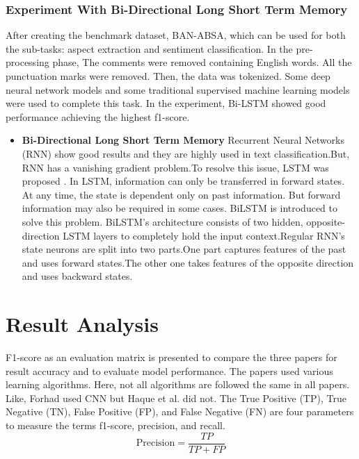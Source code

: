 \documentclass[a4paper,12pt]{article}
\begin{document}
\subsubsection{Experiment With Bi-Directional Long Short Term Memory}
After creating the benchmark dataset, BAN-ABSA, which can be used for both the sub-tasks: aspect extraction and sentiment classification.\newline
In the pre-processing phase, The comments were removed containing English words. All the punctuation marks were removed. Then, the data was tokenized.\newline
Some deep neural network models and some traditional supervised machine learning models were used to complete this task. In the experiment, Bi-LSTM showed good performance achieving the highest f1-score.
\begin{itemize}
    \item \textbf{Bi-Directional Long Short Term Memory}\newline
    Recurrent Neural Networks (RNN) show good results and they are highly used in text classification.But, RNN has a vanishing gradient problem.To resolve this issue, LSTM was proposed \cite{lstm}.\newline
    In LSTM, information can only be transferred in forward states. At any time, the state is dependent only on past information. But forward information may also be required in some cases.\newline
    BiLSTM is introduced to solve this problem. BiLSTM’s architecture consists of two hidden, opposite-direction LSTM layers to completely hold the input context.Regular RNN’s state neurons are split into two parts.One part captures features of the past and uses forward states.The other one takes features of the opposite direction and uses backward states\cite{bilstm}.
\end{itemize}


\section{Result Analysis}
F1-score as an evaluation matrix is presented to compare the three papers for result accuracy and to evaluate model performance. The papers used 
various learning algorithms. Here, not all algorithms are followed the same in all papers. Like, Forhad\cite{first} used CNN but Haque et al.\cite{second} did not.\newline
The True Positive (TP), True Negative (TN), False Positive (FP), and False Negative (FN) are four parameters to measure the terms f1-score, precision, and recall.\newline
\begin{equation}
\text{Precision} = \frac{TP}{TP + FP}
\end{equation}
\end{document}
